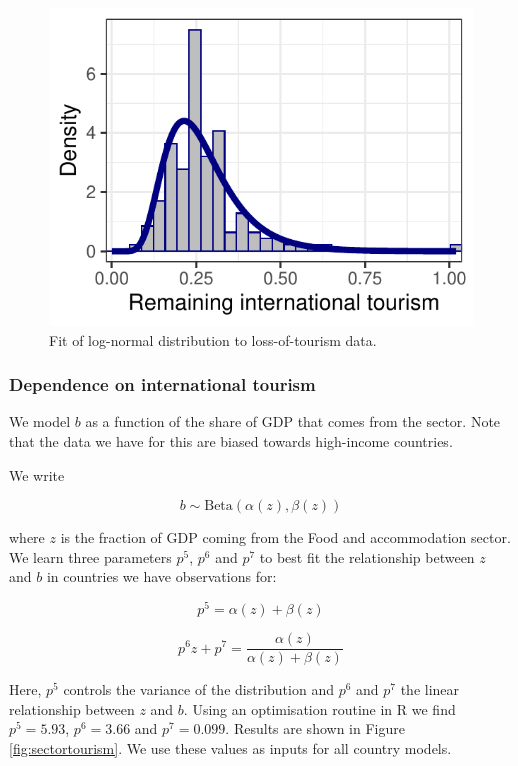 \documentclass[
]{article}
\begin{document}
\begin{figure}

{\centering \includegraphics{README_files/figure-latex/ytd-1} 

}

\caption{Fit of log-normal distribution to loss-of-tourism data.}\label{fig:ytd}
\end{figure}

\newpage

\subsubsection{Dependence on international tourism}\label{dependence-on-international-tourism}

We model \(b\) as a function of the share of GDP that comes from the sector. Note that the data we have for this are biased towards high-income countries.

We write

\[b\sim\text{Beta}(\alpha(z),\beta(z))\]

where \(z\) is the fraction of GDP coming from the Food and accommodation sector. We learn three parameters \(p^5\), \(p^6\) and \(p^7\) to best fit the relationship between \(z\) and \(b\) in countries we have observations for:

\[p^5 = \alpha(z)+\beta(z)\]

\[p^6 z + p^7 = \frac{\alpha(z)}{\alpha(z)+\beta(z)}\]

Here, \(p^5\) controls the variance of the distribution and \(p^6\) and \(p^7\) the linear relationship between \(z\) and \(b\). Using an optimisation routine in R we find \(p^5=5.93\), \(p^6=3.66\) and \(p^7=0.099\). Results are shown in Figure \ref{fig:sectortourism}. We use these values as inputs for all country models.
\end{document}
